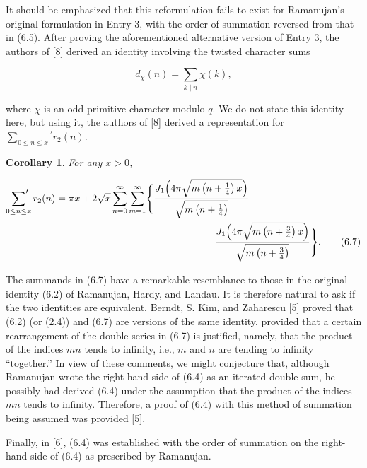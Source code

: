 \documentclass[10pt]{article}
\newcommand{\sump}{\sideset{}{'}\sum}
\theoremstyle{plain}
\newtheorem{corollary}[theorem]{Corollary}
\begin{document}
It should be emphasized that this reformulation fails to exist for Ramanujan's original formulation in Entry 3, with the order of summation reversed from that in (6.5). After proving the aforementioned alternative version of Entry 3, the authors of [8] derived an identity involving the twisted character sums


\begin{equation*}
d_{\chi}(n)=\sum_{k \mid n} \chi(k), \tag{6.6}
\end{equation*}


where $\chi$ is an odd primitive character modulo $q$. We do not state this identity here, but using it, the authors of [8] derived a representation for $\sum_{0 \leq n \leq x}{ }^{\prime} r_{2}(n)$.

\begin{corollary}
For any $x>0$,


\begin{align*}
\sump_{0\leq n\leq x} r_{2}(n)
={}&\pi x+2\sqrt{x}\sum_{n=0}^{\infty}\sum_{m=1}^{\infty}
\Biggl\{
\frac{J_{1}\!\left(4\pi\sqrt{m\left(n+\frac14\right)x}\right)}
     {\sqrt{m\left(n+\frac14\right)}} \\
&\hspace{4.8cm}{}-
\frac{J_{1}\!\left(4\pi\sqrt{m\left(n+\frac34\right)x}\right)}
     {\sqrt{m\left(n+\frac34\right)}}
\Biggr\}.
\tag{6.7}
\end{align*}
\end{corollary}


The summands in (6.7) have a remarkable resemblance to those in the original identity (6.2) of Ramanujan, Hardy, and Landau. It is therefore natural to ask if the two identities are equivalent. Berndt, S. Kim, and Zaharescu [5] proved that (6.2) (or (2.4)) and (6.7) are versions of the same identity, provided that a certain rearrangement of the double series in (6.7) is justified, namely, that the product of the indices $mn$ tends to infinity, i.e., $m$ and $n$ are tending to infinity ``together.'' In view of these comments, we might conjecture that, although Ramanujan wrote the right-hand side of (6.4) as an iterated double sum, he possibly had derived (6.4) under the assumption that the product of the indices $mn$ tends to infinity. Therefore, a proof of (6.4) with this method of summation being assumed was provided [5].

Finally, in [6], (6.4) was established with the order of summation on the right-hand side of (6.4) as prescribed by Ramanujan.
\end{document}
